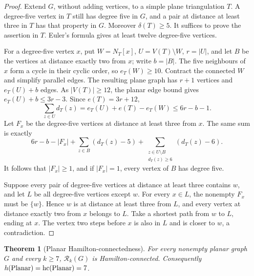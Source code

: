 \documentclass[11pt]{article}
\newtheorem{theorem}{Theorem}[section]
\theoremstyle{remark}
\newcommand{\Rk}{\mathcal R_k}
\newcommand{\hc}{\operatorname{hc}}
\numberwithin{equation}{section}
\begin{document}
\begin{proof}
Extend $G$, without adding vertices, to a simple plane triangulation
$T$.  A degree-five vertex in $T$ still has degree five in $G$, and a
pair at distance at least three in $T$ has that property in $G$.
Moreover $\delta(T)\ge5$.  It suffices to prove the assertion in $T$.
Euler's formula gives at least twelve degree-five vertices.

For a degree-five vertex $x$, put $W=N_T[x]$, $U=V(T)\setminus W$,
$r=|U|$, and let $B$ be the vertices at distance exactly two from $x$;
write $b=|B|$.  The five neighbours of $x$ form a cycle in their cyclic
order, so $e_T(W)\ge10$.  Contract the connected $W$ and simplify
parallel edges.  The resulting plane graph has $r+1$ vertices and
$e_T(U)+b$ edges.  As $|V(T)|\ge12$, the planar edge bound gives
$e_T(U)+b\le3r-3$.  Since $e(T)=3r+12$,
\[
 \sum_{z\in U}d_T(z)
 =e_T(U)+e(T)-e_T(W)\le6r-b-1.
\]
Let $F_x$ be the degree-five vertices at distance at least three from
$x$.  The same sum is exactly
\[
 6r-b-|F_x|
 +\sum_{z\in B}(d_T(z)-5)
 +\sum_{\substack{z\in U\setminus B\\ d_T(z)\ge6}}(d_T(z)-6).
\]
It follows that $|F_x|\ge1$, and if $|F_x|=1$, every vertex of $B$
has degree five.

Suppose every pair of degree-five vertices at distance at least three
contains $w$, and let $L$ be all degree-five vertices except $w$.
For every $x\in L$, the nonempty $F_x$ must be $\{w\}$.  Hence
$w$ is at distance at least three from $L$, and every vertex at distance
exactly two from $x$ belongs to $L$.  Take a shortest path from $w$
to $L$, ending at $x$.  The vertex two steps before $x$ is also in
$L$ and is closer to $w$, a contradiction.
\end{proof}

\begin{theorem}[Planar Hamilton-connectedness]
\label{thm:planar-hc}
For every nonempty planar graph $G$ and every $k\ge7$, $\Rk(G)$ is
Hamilton-connected.  Consequently
$h(\textup{Planar})=\hc(\textup{Planar})=7$.
\end{theorem}
\end{document}
